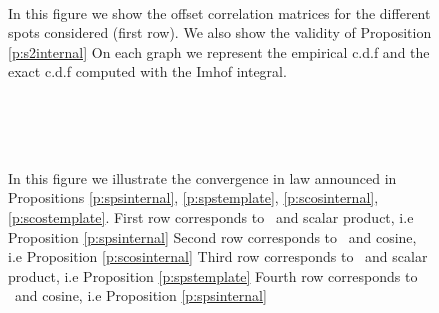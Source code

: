     \begin{figure}[H]
    \centering
     \hfill
     \hfill
     \\
     \hfill
     \hfill
     \hfill
    \caption{In this figure we show the offset correlation matrices for the different spots considered (first row). We also show the validity of Proposition \ref{p:s2internal} On each graph we represent the empirical c.d.f and the exact c.d.f computed with the Imhof integral.}
    \label{fig:l2}    
  \end{figure}
  \begin{figure}[H]
     \hfill
     \hfill
     \\
     \hfill
     \hfill
     \\
     \hfill
     \hfill
     \\
     \hfill
     \hfill
     \hfill
    \caption{In this figure we illustrate the convergence in law announced in Propositions \ref{p:spsinternal}, \ref{p:spstemplate}, \ref{p:scosinternal}, \ref{p:scostemplate}. First row corresponds to \internalmatching \ and scalar product, i.e Proposition \ref{p:spsinternal} Second row corresponds to \internalmatching \ and cosine, i.e Proposition \ref{p:scosinternal} Third row corresponds to \templatematching \ and scalar product, i.e Proposition \ref{p:spstemplate} Fourth row corresponds to \templatematching \ and cosine, i.e Proposition \ref{p:spsinternal}}
    \label{fig:tcl}
    \end{figure}


